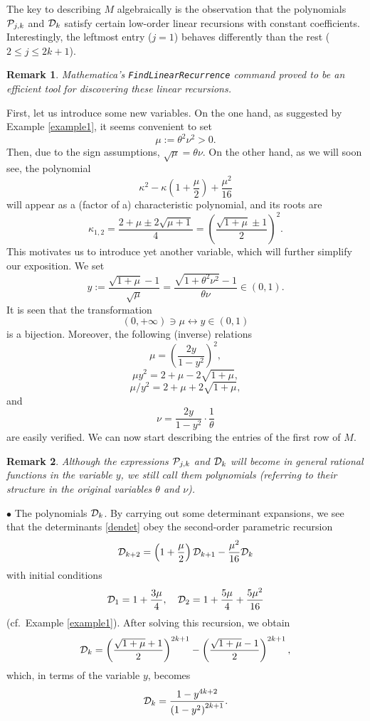 \documentclass[a4paper]{article}
\newtheorem{remark}{Remark}
\newcommand{\te}{\theta}
\newcommand{\cP}{{\cal{P}}}
\newcommand{\cD}{{\cal{D}}}
\begin{document}
The key to describing $M$ algebraically is the observation that the polynomials $\cP_{j,k}$ and $\cD_{k}$ satisfy certain low-order linear recursions with constant coefficients. Interestingly, the leftmost entry ($j=1$) behaves differently than the rest ($2\le j\le 2k+1$).


\begin{remark}
 \textit{Mathematica}'s  {\tt{FindLinearRecurrence}} command proved to be an efficient tool for discovering these linear recursions. 
\end{remark}
First, let us introduce some new variables. On the one hand, as suggested by Example \ref{example1}, it seems convenient to set
\[
\mu:=\te^2\nu^2>0.
\]
Then, due to the sign assumptions, $\sqrt{\mu}=\te\nu$. On the other hand, as we will soon see, the polynomial 
\[
\kappa ^2-\kappa  \left(1+\frac{\mu }{2}\right)+\frac{\mu ^2}{16}
\]
will appear as a (factor of a) characteristic polynomial, and its roots are
\begin{equation}\label{kappa12}
\kappa_{1,2}=\frac{2+\mu \pm 2 \sqrt{\mu +1}}{4}=\left(\frac{\sqrt{1+\mu}\pm 1}{2}\right)^2.
\end{equation}
This motivates us to introduce yet another variable, which will further simplify our exposition. We set
\begin{equation}\label{ydef01}
y:=\frac{\sqrt{1+\mu}-1}{\sqrt{\mu}}=\frac{\sqrt{1+\te^2\nu^2}-1}{\te\nu}\in (0,1).
\end{equation}
It is seen that the transformation
\[
(0,+\infty)\ni\mu \longleftrightarrow y\in(0,1)
\]
is a bijection. Moreover, the following (inverse) relations 
\[
\mu=\left(\frac{2y}{1-y^2}\right)^2,
\]
\[\mu y^2=2+\mu-2\sqrt{1+\mu},\]
\[\mu/y^2=2+\mu+2\sqrt{1+\mu},\]
and
\[
\nu=\frac{2y}{1-y^2}\cdot\frac{1}{\te}
\]
are easily verified. We can now start describing the entries of the first row of $M$.
\begin{remark}
Although the expressions $\cP_{j,k}$ and $\cD_{k}$ will become in general rational functions in the variable $y$, we still call them polynomials (referring to their structure in the original variables $\te$ and $\nu$). 
\end{remark}
$\bullet$ The polynomials $\cD_k$. By carrying out some determinant expansions, we see that the determinants \eqref{dendet} obey the second-order parametric recursion
\begin{equation}\label{Dkrec}
\cD_{k+2}=\left(1+\frac{\mu}{2}\right)\cD_{k+1}-\frac{\mu^2}{16}\cD_k
\end{equation}
with initial conditions
\[
\cD_1=1+\frac{3\mu}{4}, \quad \cD_2=1+\frac{5\mu}{4}+\frac{5\mu^2}{16}
\]
(cf.~Example \ref{example1}). After solving this recursion, we obtain
\[
\cD_k=\left(\frac{\sqrt{1+\mu}+1}{2}\right)^{2 k+1}- \left(\frac{\sqrt{1+\mu}-1}{2}\right)^{2 k+1},
\]
which, in terms of the variable $y$, becomes
\begin{equation}\label{expldet}
\cD_k=\frac{1-y^{4 k+2}}{\left(1-y^2\right)^{2 k+1} }.
\end{equation}
\end{document}
